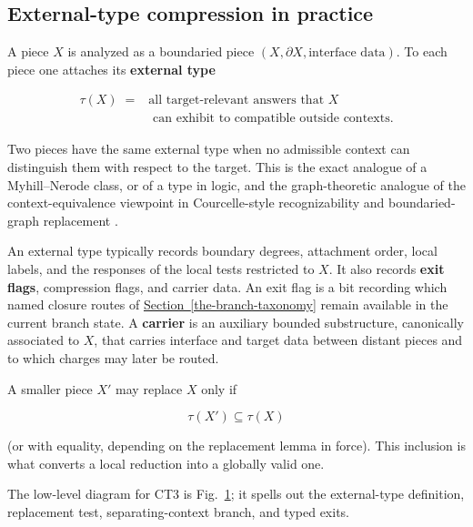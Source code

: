 \documentclass[
  11pt,
]{article}
\theoremstyle{definition}
\newcommand{\secref}[1]{\hyperref[#1]{Section~\ref*{#1}}}
\begin{document}
\begin{figure}[p]
\label{fig:ct3-external-type-compression}
\end{figure}
\FloatBarrier

\subsection*{External-type compression in practice}

A piece \(X\) is analyzed as a boundaried piece
\((X,\partial X,\text{interface data})\). To each piece one attaches its
\textbf{external type}

\[
\begin{aligned}
\tau(X) \;={}& \text{all target-relevant answers that } X\\
&\text{ can exhibit to compatible outside contexts}.
\end{aligned}
\]

Two pieces have the same external type when no admissible context can
distinguish them with respect to the target. This is the exact analogue
of a Myhill--Nerode class, or of a type in logic, and the
graph-theoretic analogue of the context-equivalence viewpoint in
Courcelle-style recognizability and boundaried-graph replacement
\citep{myhill-1957-automata, nerode-1958-linear, courcelle-1990-mso-graphs, courcelle-engelfriet-2012-graph-structure, bodlaender-etal-2009-meta-kernelization}.

An external type typically records boundary degrees, attachment order,
local labels, and the responses of the local tests restricted to \(X\).
It also records \textbf{exit flags}, compression flags, and carrier
data. An exit flag is a bit recording which named closure routes of
\secref{the-branch-taxonomy} remain available in the current branch state. A
\textbf{carrier} is an auxiliary bounded substructure, canonically
associated to \(X\), that carries interface and target data between
distant pieces and to which charges may later be routed.

A smaller piece \(X'\) may replace \(X\) only if

\[
\tau(X') \subseteq \tau(X)
\]

(or with equality, depending on the replacement lemma in force). This
inclusion is what converts a local reduction into a globally valid one.

The low-level diagram for CT3 is Fig.~\ref{fig:ct3-external-type-compression};
it spells out the external-type definition, replacement test,
separating-context branch, and typed exits.
\end{document}
